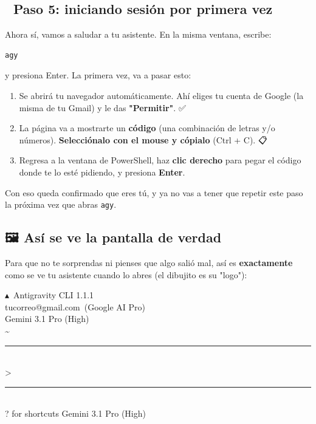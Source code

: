 \documentclass[12pt]{article}
\begin{document}
\subsection{🔑 Paso 5: iniciando sesión por primera vez}
Ahora sí, vamos a saludar a tu asistente. En la misma ventana, escribe:
\begin{verbatim}
agy
\end{verbatim}
y presiona Enter. La primera vez, va a pasar esto:
\begin{enumerate}
    \item Se abrirá tu navegador automáticamente. Ahí eliges tu cuenta de Google (la misma de tu Gmail) y le das \textbf{"Permitir"}. ✅
    \item La página va a mostrarte un \textbf{código} (una combinación de letras y/o números). \textbf{Selecciónalo con el mouse y cópialo} (Ctrl + C). 📋
    \item Regresa a la ventana de PowerShell, haz \textbf{clic derecho} para pegar el código donde te lo esté pidiendo, y presiona \textbf{Enter}.
\end{enumerate}
Con eso queda confirmado que eres tú, y ya no vas a tener que repetir este paso la próxima vez que abras \texttt{agy}. 🔑

\subsection{🖼️ Así se ve la pantalla de verdad}
Para que no te sorprendas ni pienses que algo salió mal, así es \textbf{exactamente} como se ve tu asistente cuando lo abres (el dibujito es su "logo"):

\begin{center}
\begin{tcolorbox}[
    enhanced,
    width=0.92\textwidth,
    colback=termbg,
    colframe=termbar,
    boxrule=0pt,
    arc=5pt,
    outer arc=5pt,
    top=10pt, bottom=10pt, left=14pt, right=14pt,
    drop fuzzy shadow,
    title={\hspace{2pt}\raisebox{-0.15em}{\textcolor{dotred}{\Large\textbullet}}\,\textcolor{dotyellow}{\Large\textbullet}\,\textcolor{dotgreen}{\Large\textbullet}\hfill \color{white}\ttfamily\footnotesize Windows PowerShell \hfill\phantom{x}},
    colbacktitle=termbar,
    coltitle=white,
    fonttitle=\ttfamily,
    top=8pt,
]
{\ttfamily\small
\textcolor{termcyan}{$\blacktriangle$}\ \textcolor{termgreen}{Antigravity CLI 1.1.1}\\[4pt]
\textcolor{termwhite}{tucorreo@gmail.com}\ \textcolor{termgray}{(Google AI Pro)}\\[4pt]
\textcolor{termyellow}{Gemini 3.1 Pro (High)}\\[4pt]
\textcolor{termgray}{\textasciitilde}

\vspace{8pt}
\textcolor{termbar}{\rule{\linewidth}{0.6pt}}\\[6pt]
\textcolor{termwhite}{\textgreater}\\[6pt]
\textcolor{termbar}{\rule{\linewidth}{0.6pt}}\\[6pt]
\textcolor{termgray}{? for shortcuts} \hfill \textcolor{termgreen}{Gemini 3.1 Pro (High)}
}
\end{tcolorbox}
\end{center}
\end{document}
